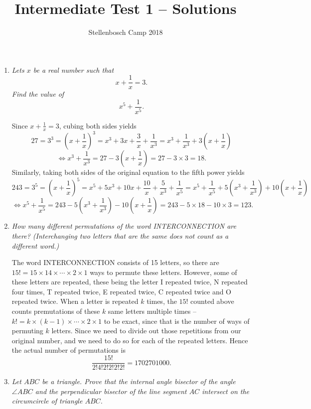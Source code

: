 \documentclass{article}
\title{Intermediate Test 1 -- Solutions}
\author{Stellenbosch Camp 2018}
\begin{document}
\maketitle

\begin{enumerate}[1.]

\item %
\textit{Lets $x$ be a real number such that \[ x +\frac{1}{x} = 3. \] Find the value of \[ x^5 +\frac{1}{x^5}. \]}

Since $x+\frac{1}{x} = 3$, cubing both sides yields \[ 27 = 3^3 = \left(x+\frac{1}{x}\right)^3 = x^3 +3x +\frac{3}{x} +\frac{1}{x^3} = x^3 +\frac{1}{x^3} +3\left(x+\frac{1}{x}\right) \]
\[ \iff x^3+\frac{1}{x^3} = 27 -3\left(x+\frac{1}{x}\right) = 27 -3\times3 = 18. \]
Similarly, taking both sides of the original equation to the fifth power yields \[ 243 = 3^5 = \left(x+\frac{1}{x}\right)^5 = x^5 +5x^3 +10x +\frac{10}{x} +\frac{5}{x^3} +\frac{1}{x^5} = x^5 +\frac{1}{x^5} +5\left(x^3 +\frac{1}{x^3}\right) +10\left(x+\frac{1}{x}\right) \]
\[ \iff x^5 +\frac{1}{x^5} = 243 -5\left(x^3 +\frac{1}{x^3}\right) -10\left(x+\frac{1}{x}\right) = 243 -5\times18 -10\times3 = 123. \]


\vspace{12pt}
\item %
\textit{How many different permutations of the word INTERCONNECTION are there? (Interchanging two letters that are the same does not count as a different word.)}

The word INTERCONNECTION consists of 15 letters, so there are $15! = 15\times14\times\dotsm\times2\times1$ ways to permute these letters. However, some of these letters are repeated, these being the letter I repeated twice, N repeated four times, T repeated twice, E repeated twice, C repeated twice and O repeated twice. When a letter is repeated $k$ times, the $15!$ counted above counts premutations of these $k$ same letters multiple times -- $k! = k\times(k-1)\times\dotsm\times2\times1$ to be exact, since that is the number of ways of permuting $k$ letters. Since we need to divide out those repetitions from our original number, and we need to do so for each of the repeated letters. Hence the actual number of permutations is \[\frac{15!}{2!4!2!2!2!2!} = 1702701000. \]


\vspace{12pt}
\item %
\textit{Let $ABC$ be a triangle. Prove that the internal angle bisector of the angle $\angle ABC$ and the perpendicular bisector of the line segment $AC$ intersect on the circumcircle of triangle $ABC$.}


\end{enumerate}
\end{document}
